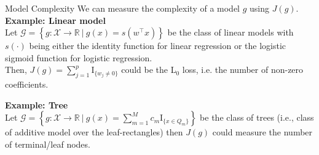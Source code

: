 \documentclass[aspectratio=169]{../latex_main/tntbeamer}  %
\begin{document}
\begin{frame}{Model Complexity}
We can measure the complexity of a model $g$ using $J(g)$. \\ 
\vspace{0.5cm}
 	\textbf{Example: Linear model}\\
 	Let $\mathcal{G} = \left\{g: \mathcal{X} \to \mathbb{R} ~|~g(x) = s(w^\top x)\right\}$ be the class of linear models with $s(\cdot)$ being either the identity function for linear regression or the logistic sigmoid function for logistic regression. \\
 	Then, $J(g) = \sum_{j = 1}^p \mathrm{I}_{\{ w_j \neq 0 \}}$ could be the L$_0$ loss, i.e. the number of non-zero coefficients. 
 	\vspace{0.5cm}
 	
 	\textbf{Example: Tree}\\
 	Let $\mathcal{G} = \left\{g:\mathcal{X} \to \mathbb{R} ~|~g(x) = \sum_{m=1}^M c_m \mathrm{I}_{\{ x \in Q_m \}}\right\}$ be the class of trees (i.e., class of additive model over the leaf-rectangles) then $J(g)$ could measure the number of terminal/leaf nodes.\\
 \end{frame}
\end{document}
